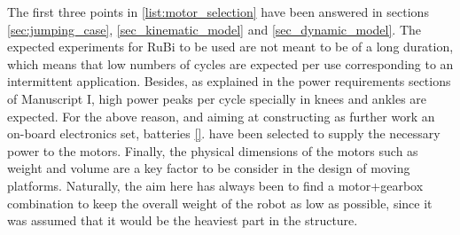The first three points in \ref{list:motor_selection} have been answered in sections \ref{sec:jumping_case}, \ref{sec_kinematic_model} and \ref{sec_dynamic_model}.
The expected experiments for RuBi to be used are not meant to be of a long duration, which means that low numbers of cycles are expected per use corresponding to an intermittent application.
Besides, as explained in the power requirements sections of \cite{grimmer} Manuscript I, high power peaks per cycle specially in knees and ankles are expected.
For the above reason, and aiming at constructing as further work an on-board electronics set, batteries \ref{}. 
have been selected to supply the necessary power to the motors.
Finally, the physical dimensions of the motors such as weight and volume are a key factor to be consider in the design of moving platforms. 
Naturally, the aim here has always been to find a motor+gearbox combination to keep the overall weight of the robot as low as possible, since it was assumed that it would be the heaviest part in the structure.
